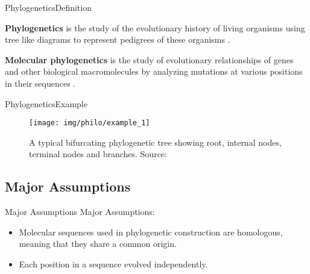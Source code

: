 \documentclass[10pt]{beamer}
\newcommand{\1}{
	\setbeamertemplate{background}{
		\texttt{[image: img/1]}
		\tikz[overlay] \fill[fill opacity=0.75,fill=white] (0,0) rectangle (-\paperwidth,\paperheight);
	}
}
\begin{document}
\begin{frame}{Phylogenetics}{Definition}
	\begin{block}{}
		\textbf{Phylogenetics} is the study of the evolutionary history of living organisms using tree like diagrams to represent pedigrees of these organisms \cite{xiong2006essential}. 		
	\end{block}

	\begin{block}{}
		\textbf{Molecular phylogenetics} is the study of evolutionary relationships of genes and other biological macromolecules by analyzing mutations at various positions in their sequences \cite{xiong2006essential}. 		
	\end{block}
\end{frame}


\begin{frame}{Phylogenetics}{Example}
	\begin{figure}
		\texttt{[image: img/philo/example\_1]}
		\caption{A typical bifurcating phylogenetic tree showing root, internal nodes, terminal nodes and branches. Source: \cite{xiong2006essential}}			
	\end{figure}
\end{frame}

\subsection{Major Assumptions}

\begin{frame}{Major Assumptions}{}
	Major Assumptions:	
	\begin{block}{}
		\begin{itemize}
			\item 		Molecular sequences used in phylogenetic construction are homologous, meaning that they share a common origin. 		
			\item Each position in a sequence evolved independently. 		
		\end{itemize}
	\end{block}
\end{frame}
\end{document}
